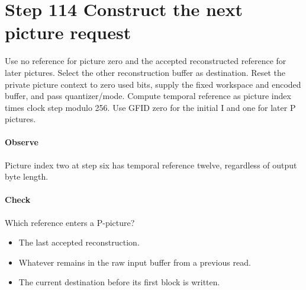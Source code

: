 \section{Step 114 Construct the next picture request}\label{h263-clip-s04}
Use no reference for picture zero and the accepted reconstructed reference for
later pictures. Select the other reconstruction buffer as destination. Reset the
private picture context to zero used bits, supply the fixed workspace and encoded
buffer, and pass quantizer/mode. Compute temporal reference as picture index times
clock step modulo 256. Use GFID zero for the initial I and one for later P pictures.

\paragraph{Observe} Picture index two at step six has temporal reference twelve, regardless of output byte length.
\paragraph{Check} Which reference enters a P-picture?
\begin{itemize}
  \item[A.] The last accepted reconstruction.
  \item[B.] Whatever remains in the raw input buffer from a previous read.
  \item[C.] The current destination before its first block is written.
\end{itemize}
